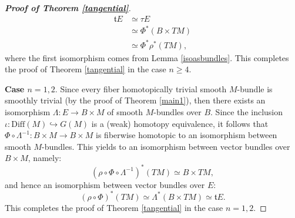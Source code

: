 \documentclass[onecolumn,notitlepage,11pt]{article}
\newcommand{\beq}{\begin{equation*}}
\newcommand{\eeq}{\end{equation*}}
\theoremstyle{definition}
\begin{document}
\begin{proof}[\textbf{Proof of Theorem \ref{tangential}}]
\begin{align*}
\mathfrak{t}E & \simeq\tau E\\
			   &\simeq\Phi^*(B\times TM)\\
			   &\simeq\Phi^*\rho^*(TM),
\end{align*}
where the first isomorphism comes from Lemma 
\ref{isoasbundles}. This completes the proof of Theorem \ref{tangential}
in the case $n\geq 4$.

\textbf{Case $n=1,2$}.
Since every fiber homotopically trivial smooth $M$-bundle is smoothly
trivial (by the proof of Theorem \ref{main1}), then there exists an
isomorphism $\Lambda:E\to B\times M$ of smooth $M$-bundles over $B$.
Since the inclusion $\iota:\mbox{Diff}(M)\hookrightarrow G(M)$ is a (weak)
homotopy equivalence, it follows that 
$\Phi\circ\Lambda^{-1}:B\times M\to B\times M$ is fiberwise homotopic to
an isomorphism between smooth $M$-bundles. This yields to an isomorphism
between vector bundles over $B\times M$, namely:
\beq
(\rho\circ\Phi\circ\Lambda^{-1})^*(TM)\simeq B\times TM,
\eeq
and hence an isomorphism between vector bundles over $E$:
\beq
(\rho\circ\Phi)^*(TM)\simeq\Lambda^*(B\times TM)\simeq\mathfrak{t}E.
\eeq
This completes the proof of Theorem \ref{tangential} in the case $n=1,2$.
\end{proof}
\end{document}
